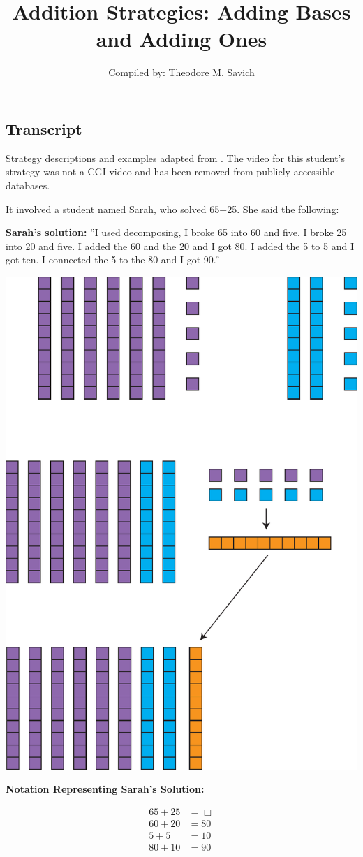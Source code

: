 \documentclass[11pt]{article}
\title{Addition Strategies: Adding Bases and Adding Ones}
\author{Compiled by: Theodore M. Savich}
\begin{document}
\maketitle
\subsection*{Transcript}
Strategy descriptions and examples adapted from \textcite{HackenbergCourseNotes}. The video for this student's strategy was not a CGI video and has been removed from publicly accessible databases. 

It involved a student named Sarah, who solved 65+25. She said the following:

\textbf{Sarah's solution:} ''I used decomposing, I broke 65 into 60 and five. I broke 25 into 20 and five. I added the 60 and the 20 and I got 80. I added the 5 to 5 and I got ten. I connected the 5 to the 80 and I got 90.''


\includegraphics[width=.8\textwidth]{images/Easy_Pictures/SAR_ADD_ABAO/PDF/SAR_ADD_ABAO.pdf}

\noindent \textbf{Notation Representing Sarah's Solution:}

\begin{align*}
65 + 25 &= \Box \\
60 + 20 &= 80\\
5 + 5  &= 10\\
80+10 &= 90
\end{align*}
\end{document}
